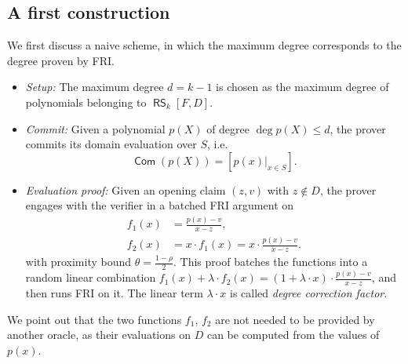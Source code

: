 \documentclass[11pt,article,oneside]{memoir}
\theoremstyle{definition}
\theoremstyle{remark}
\DeclareMathOperator{\comm}{\mathsf{Com}}
\DeclareMathOperator{\RS}{\mathsf{RS}}
\begin{document}
\subsection{A first construction}
\label{s:naivePC}

We first discuss a naive scheme, in which the maximum degree corresponds to the degree proven by FRI.
\begin{itemize}
\item 
\textit{Setup:}
The maximum degree $d=k-1$ is chosen as the maximum degree of polynomials belonging to $\RS_k[F,D]$.

\item
\textit{Commit:} 
Given a polynomial $p(X)$ of degree $\deg p(X)\leq d$, the prover commits its domain evaluation over $S$, i.e. 
\[
\comm(p(X))= [p(x)|_{x\in S}].
\]

\item
\textit{Evaluation proof: }
Given an opening claim $(z,v)$ with $z\notin D$, the prover engages with the verifier in a batched FRI argument on
\begin{align*}
f_1(x) &= \frac{p(x)-v}{x-z},
\\
f_2(x) &=x\cdot f_1(x)= x\cdot \frac{p(x)-v}{x-z}.
\end{align*}
with proximity bound $\theta = \frac{1-\rho}{2}$. 
This proof batches the functions into a random linear combination $f_1(x)+ \lambda\cdot f_2(x) =(1+\lambda \cdot x)\cdot \frac{p(x)-v}{x-z}$, and then runs FRI on it. 
The linear term $\lambda \cdot x$ is called \textit{degree correction factor}.
\end{itemize}

We point out that the two functions $f_1$, $f_2$ are not needed to be provided by another oracle, as their evaluations on $D$ can be computed from the values of $p(x)$.
\end{document}
